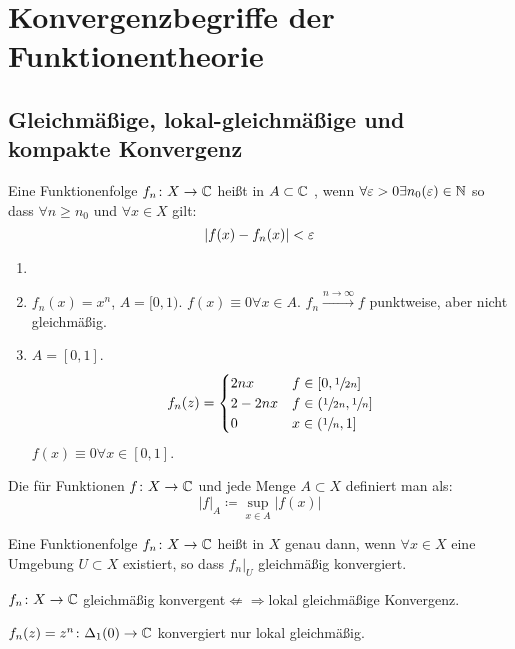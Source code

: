 \chapter{Konvergenzbegriffe der Funktionentheorie}
\section{Gleichm\"a\ss ige, lokal-gleichm\"a\ss ige und kompakte Konvergenz}
\begin{definition}
	Eine Funktionenfolge $ f_n\colon X\rightarrow\mathbb{C} $ hei\ss t in $ A\subset\mathbb{C} $ , wenn $ \forall\varepsilon>0\exists n_0(\varepsilon)\in\mathbb{N} $ so dass $ \forall n\geq n_0 $ und $ \forall x\in X $ gilt:
	\[ |f(x)-f_n(x)|<\varepsilon \]
\end{definition}
\begin{beispiel*}
	\begin{enumerate}
		\item[]
		\item 	$ f_n(x)=x^n $, $ A=[0,1) $. $ f(x)\equiv 0\forall x\in A $. $ f_n\xrightarrow{n\to\infty}f $ punktweise, aber nicht gleichm\"a\ss ig.
		\item $ A=[0,1] $.
		\[ f_n(z)=\begin{cases}
		2nx&f\in[0,\sfrac{1}{2n}]\\
		2-2nx&f\in(\sfrac{1}{2n},\sfrac{1}{n}]\\
		0&x\in(\sfrac{1}{n},1]
		\end{cases} \]
		$ f(x)\equiv 0\forall x\in[0,1] $.
	\end{enumerate}
\end{beispiel*}
\begin{definition}
	Die  f\"ur Funktionen $ f\colon X\rightarrow\mathbb{C} $ und jede Menge $ A\subset X $ definiert man als:
	\[ |f|_A\coloneqq\sup_{x\in A}|f(x)| \]
\end{definition}
\begin{definition}
	Eine Funktionenfolge $ f_n\colon X\rightarrow\mathbb{C} $ hei\ss t  in $ X $ genau dann, wenn $ \forall x\in X $ eine Umgebung $ U\subset X $ existiert, so dass $ f_n|_U $ gleichm\"a\ss ig konvergiert.
\end{definition}
\begin{bemerkung*}
	$ f_n\colon X\rightarrow\mathbb{C} $ gleichm\"a\ss ig konvergent$ \nLeftarrow\Rightarrow $lokal gleichm\"a\ss ige Konvergenz.
\end{bemerkung*}
\begin{beispiel*}
	$ f_n(z)=z^n\colon\Delta_1(0)\rightarrow\mathbb{C}$ konvergiert nur lokal gleichm\"a\ss ig.
\end{beispiel*}
